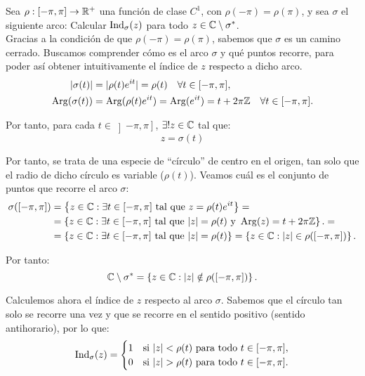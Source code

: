 \begin{ejercicio}
    Sea $\rho : [-\pi,\pi] \to \mathbb{R}^+$ una función de clase $C^1$, con $\rho(-\pi)=\rho(\pi)$, y sea $\sigma$ el siguiente arco:
    Calcular $\operatorname{Ind}_\sigma(z)$ para todo $z \in \mathbb{C}\setminus\sigma^*$.\\

    Gracias a la condición de que $\rho(-\pi) = \rho(\pi)$, sabemos que $\sigma$ es un camino cerrado. Buscamos comprender cómo es el arco $\sigma$ y qué puntos recorre, para poder así obtener intuitivamente el índice de $z$ respecto a dicho arco.
    \begin{align*}
        |\sigma(t)| &= |\rho(t)e^{it}| = \rho(t) \quad \forall t \in [-\pi,\pi],\\
        \operatorname{Arg}(\sigma(t)) &= \operatorname{Arg}(\rho(t)e^{it}) = \operatorname{Arg}(e^{it}) = t + 2\pi\mathbb{Z} \quad \forall t \in [-\pi,\pi].
    \end{align*}

    Por tanto, para cada $t \in \left]-\pi,\pi\right]$, $\exists! z\in \mathbb{C}$ tal que:
    \begin{equation*}
        z = \sigma(t)
    \end{equation*}

    Por tanto, se trata de una especie de ``círculo'' de centro en el origen, tan solo que el radio de dicho círculo es variable ($\rho(t)$). Veamos cuál es el conjunto de puntos que recorre el arco $\sigma$:
    \begin{align*}
        \sigma([- \pi, \pi]) &= \left\{ z \in \mathbb{C} : \exists t \in [-\pi,\pi] \text{ tal que } z = \rho(t)e^{it} \right\}
        =\\&= \left\{ z \in \mathbb{C} : \exists t \in [-\pi,\pi] \text{ tal que } |z| = \rho(t) \text{ y } \operatorname{Arg}(z) = t + 2\pi\mathbb{Z} \right\}.
        = \\&= \left\{ z \in \mathbb{C} : \exists t \in [-\pi,\pi] \text{ tal que } |z| = \rho(t)\right\}
        = \left\{ z \in \mathbb{C} : |z|\in \rho([- \pi, \pi]) \right\}.
    \end{align*}

    Por tanto:
    \begin{equation*}
        \mathbb{C}\setminus\sigma^* = \left\{ z \in \mathbb{C} : |z| \notin \rho([- \pi, \pi]) \right\}.
    \end{equation*}
    
    Calculemos ahora el índice de $z$ respecto al arco $\sigma$.
    Sabemos que el círculo tan solo se recorre una vez y que se recorre en el sentido positivo (sentido antihorario), por lo que:
    \begin{equation*}
        \operatorname{Ind}_\sigma(z) = \begin{cases}
            1 & \text{si } |z| < \rho(t) \text{ para todo } t \in [-\pi,\pi],\\
            0 & \text{si } |z| > \rho(t) \text{ para todo } t \in [-\pi,\pi].
        \end{cases}
    \end{equation*}


\end{ejercicio}
